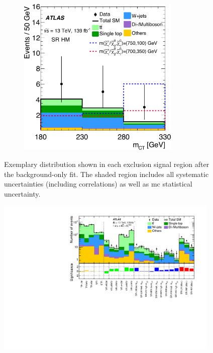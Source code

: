 \begin{figure}
\begin{subfigure}[b]{0.5\linewidth}
		\centering\includegraphics[width=0.85\textwidth]{OneLepton_Wh_SRHMEM_mct2_yellow}
	\end{subfigure}\hfill

	\caption{Exemplary distribution shown in each exclusion signal region after the background-only fit. The shaded region includes all systematic uncertainties (including correlations) as well as \gls{mc} statistical uncertainty.}
	\label{fig:SR_distributions_postfit}
\end{figure}


 \begin{figure}
	\centering\includegraphics[width=0.95\textwidth]{histpull_CRVRSR}
	\caption{}
	\label{fig:result_histpull}
\end{figure}


